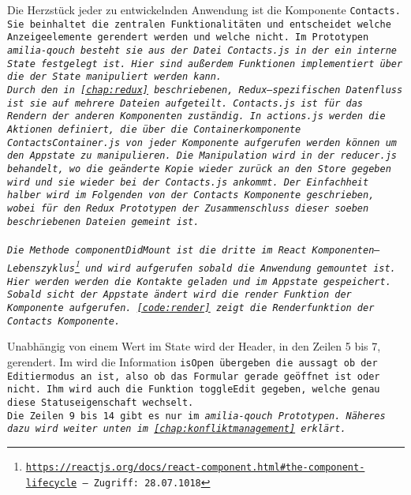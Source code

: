 Die Herzstück jeder zu entwickelnden Anwendung ist die Komponente \tt{Contacts}.
Sie beinhaltet die zentralen Funktionalitäten und entscheidet welche Anzeigeelemente gerendert werden und welche nicht.
Im Prototypen \it{amilia-qouch} besteht sie aus der Datei \tt{Contacts.js} in der ein interne State festgelegt ist. Hier sind außerdem Funktionen implementiert über die der State manipuliert werden kann.\\
Durch den in \autoref{chap:redux} beschriebenen, Redux--spezifischen Datenfluss ist sie auf mehrere Dateien aufgeteilt.
\tt{Contacts.js} ist für das Rendern der anderen Komponenten zuständig. 
In \tt{actions.js} werden die Aktionen definiert, die über die Containerkomponente \tt{ContactsContainer.js} von jeder Komponente aufgerufen werden können um den \gls{App}state zu manipulieren.
Die Manipulation wird in der \tt{reducer.js} behandelt, wo die geänderte Kopie wieder zurück an den \tt{Store} gegeben wird und sie wieder bei der \tt{Contacts.js} ankommt.
Der Einfachheit halber wird im Folgenden von der \tt{Contacts} Komponente geschrieben, wobei für den Redux Prototypen der Zusammenschluss dieser soeben beschriebenen Dateien gemeint ist.\\\\
Die Methode \tt{componentDidMount} ist die dritte im React Komponenten--Lebenszyklus\footnote{ \url{https://reactjs.org/docs/react-component.html\#the-component-lifecycle} -- Zugriff: 28.07.1018} und wird aufgerufen sobald die Anwendung gemountet ist.
Hier werden werden die Kontakte geladen und im \gls{App}state gespeichert.
Sobald sicht der \gls{App}state ändert wird die \tt{render} Funktion der Komponente aufgerufen. \autoref{code:render} zeigt die Renderfunktion der \tt{Contacts} Komponente.
%
\begin{center}
  
\end{center}
%
Unabhängig von einem Wert im State wird der Header, in den Zeilen 5 bis 7, gerendert.
Im wird die Information \tt{isOpen} übergeben die aussagt ob der Editiermodus an ist, also ob das Formular gerade geöffnet ist oder nicht.
Ihm wird auch die Funktion \tt{toggleEdit} gegeben, welche genau diese Statuseigenschaft wechselt.\\
Die Zeilen 9 bis 14 gibt es nur im \it{amilia-qouch} Prototypen. Näheres dazu wird weiter unten im \autoref{chap:konfliktmanagement} erklärt.\\
